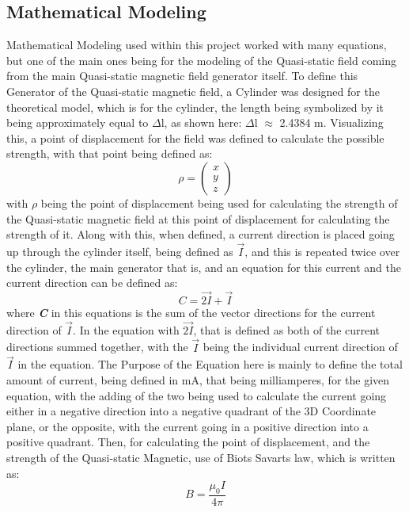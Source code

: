 \documentclass[]{article}
\begin{document}
\subsection*{Mathematical Modeling}
Mathematical Modeling used within this project worked with many equations, but one of the main ones being for the modeling of the Quasi-static field coming from the main Quasi-static magnetic field generator itself. To define this Generator of the Quasi-static magnetic field, a Cylinder was designed for the theoretical model, which is for the cylinder, the length being symbolized by it being approximately equal to $\Delta$l, as shown here: $\Delta$l $\approx$ 2.4384 m. Visualizing this, a point of displacement for the field was defined to calculate the possible strength, with that point being defined as:
\begin{equation}
\rho =  \left(\begin{array}{c}
x \\
y \\
z 
\end{array}\right)
\end{equation}
with $\rho$ being the point of displacement being used for calculating the strength of the Quasi-static magnetic field at this point of displacement for calculating the strength of it. Along with this, when defined, a current direction is placed going up through the cylinder itself, being defined as $\vec{I}$, and this is repeated twice over the cylinder, the main generator that is, and an equation for this current and the current direction can be defined as:
\begin{equation}
C = \vec{2I} + \vec{I}
\end{equation}
where \textbf{\textit{C}} in this equations is the sum of the vector directions for the current direction of $\vec{I}$. In the equation with $\vec{2I}$, that is defined as both of the current directions summed together, with the $\vec{I}$ being the individual current direction of $\vec{I}$ in the equation. The Purpose of the Equation here is mainly to define the total amount of current, being defined in mA, that being milliamperes, for the given equation, with the adding of the two being used to calculate the current going either in a negative direction into a negative quadrant of the 3D Coordinate plane, or the opposite, with the current going in a positive direction into a positive quadrant. Then, for calculating the point of displacement, and the strength of the Quasi-static Magnetic, use of Biots Savarts law, which is written as:
\begin{equation}
B = \frac{\mu_0I}{4\pi}
\end{equation}
\end{document}
